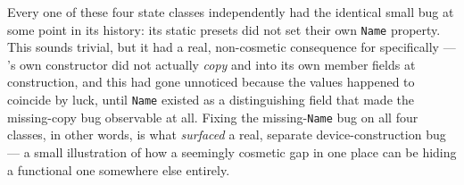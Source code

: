 Every one of these four state classes independently had the identical small bug at some
point in its history: its static presets did not set their own \texttt{Name} property. This
sounds trivial, but it had a real, non-cosmetic consequence for 
specifically --- 's own constructor did not actually \emph{copy}
 and 
into its own member fields at construction, and this had gone unnoticed because the values
happened to coincide by luck, until \texttt{Name} existed as a distinguishing field that
made the missing-copy bug observable at all. Fixing the missing-\texttt{Name} bug on all four
classes, in other words, is what \emph{surfaced} a real, separate device-construction bug ---
a small illustration of how a seemingly cosmetic gap in one place can be hiding a functional
one somewhere else entirely.

